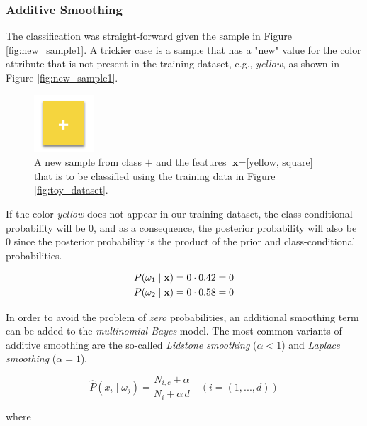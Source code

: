 \documentclass{article}
\begin{document}
\subsubsection{Additive Smoothing}
\label{sec:additive_smoothing}

The classification was straight-forward given the sample in Figure \ref{fig:new_sample1}. A trickier case is a sample that has a "new" value for the color attribute that is not present in the training dataset, e.g., \emph{yellow}, as shown in Figure \ref{fig:new_sample1}.

 \begin{figure}[h!]
\includegraphics[scale=0.5]{../images/toy_dataset_3.png}
\caption{A new sample from class $+$ and the features $\textbf{x} = \text{[yellow, square]}$ that is to be classified using the training data in Figure \ref{fig:toy_dataset}.}
\label{fig:new_sample2}
\end{figure}


If the color \emph{yellow} does not appear in our training dataset, the class-conditional probability will be 0, and as a consequence, the posterior probability will also be 0 since the posterior probability is the product of the prior and class-conditional probabilities.

\begin{equation} 
\begin{split}
& P(\omega_1 \mid \textbf x) = 0  \cdot  0.42 = 0 \\
& P(\omega_2 \mid \textbf x) = 0  \cdot  0.58 = 0 
\end{split}
\end{equation} 

In order to avoid the problem of \emph{zero} probabilities, an additional smoothing term can be added to the \emph{multinomial Bayes} model. The most common variants of additive smoothing are the so-called \emph{Lidstone smoothing} ($\alpha<1$) and  \emph{Laplace smoothing} ($\alpha=1$).


\begin{equation} \hat{P}(x_i \mid \omega_j) = \frac{N_{i,c}+\alpha}{N_i + \alpha \, d}  \quad (i = (1, ..., d))\end{equation}

where
\end{document}
